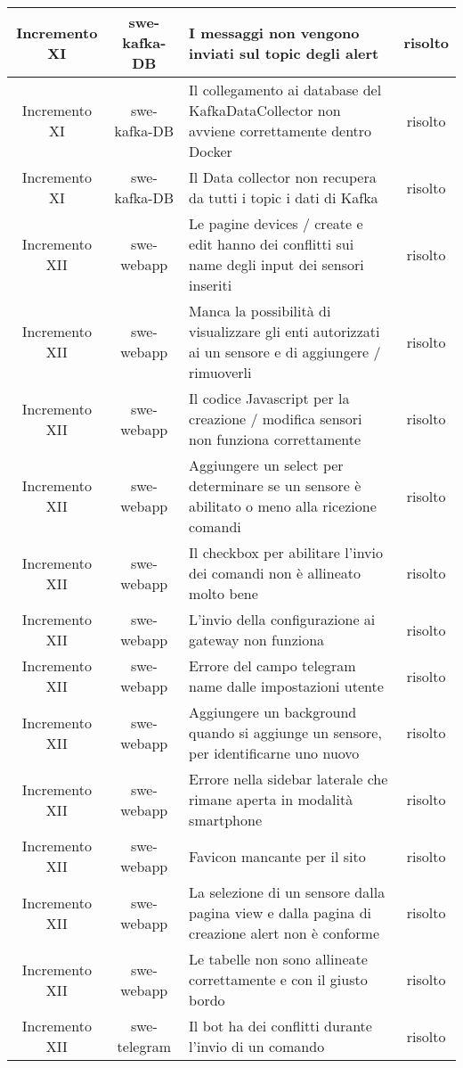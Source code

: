 \begin{center}
\begin{longtable}{|c|c|p{9.5cm}|c|}
    \hline
    Incremento XI & swe-kafka-DB & I messaggi non vengono inviati sul topic degli alert & risolto \\
    \hline
    Incremento XI & swe-kafka-DB & Il collegamento ai database del KafkaDataCollector non avviene correttamente dentro Docker & risolto \\
    \hline
    Incremento XI & swe-kafka-DB & Il Data collector non recupera da tutti i topic i dati di Kafka & risolto \\
    \hline
    Incremento XII & swe-webapp & Le pagine devices / create e edit hanno dei conflitti sui name degli input dei sensori inseriti & risolto \\
    \hline
    Incremento XII & swe-webapp & Manca la possibilità di visualizzare gli enti autorizzati ai un sensore e di aggiungere / rimuoverli & risolto \\
    \hline
    Incremento XII & swe-webapp & Il codice Javascript per la creazione / modifica sensori non funziona correttamente & risolto \\
    \hline
    Incremento XII & swe-webapp & Aggiungere un select per determinare se un sensore è abilitato o meno alla ricezione comandi & risolto \\
    \hline
    Incremento XII & swe-webapp & Il checkbox per abilitare l'invio dei comandi non è allineato molto bene & risolto \\
    \hline
    Incremento XII & swe-webapp & L'invio della configurazione ai gateway non funziona & risolto \\
    \hline
    Incremento XII & swe-webapp & Errore del campo telegram name dalle impostazioni utente  & risolto \\
    \hline
    Incremento XII & swe-webapp & Aggiungere un background quando si aggiunge un sensore, per identificarne uno nuovo & risolto \\
    \hline
    Incremento XII & swe-webapp & Errore nella sidebar laterale che rimane aperta in modalità smartphone  & risolto \\
    \hline
    Incremento XII & swe-webapp & Favicon mancante per il sito & risolto \\
    \hline
    Incremento XII & swe-webapp & La selezione di un sensore dalla pagina view e dalla pagina di creazione alert non è conforme & risolto \\
    \hline
    Incremento XII & swe-webapp & Le tabelle non sono allineate correttamente e con il giusto bordo & risolto \\
    \hline
    Incremento XII & swe-telegram & Il bot ha dei conflitti durante l'invio di un comando & risolto \\

\end{longtable}
\end{center}
